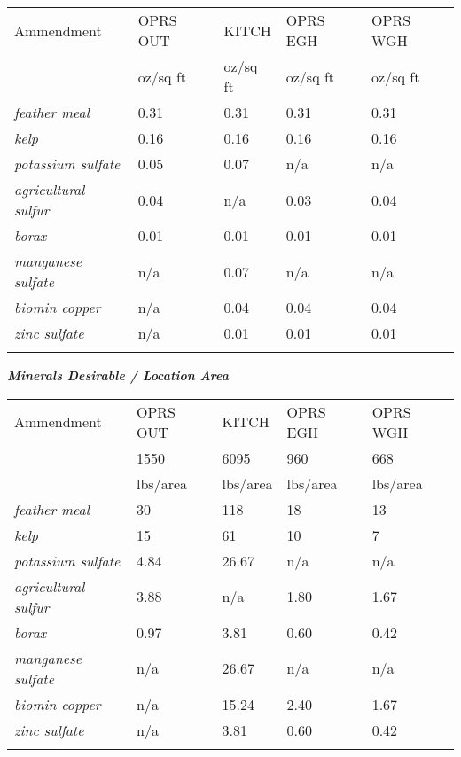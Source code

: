 \begin{longtable}[c]{@{}lllll@{}}
\toprule\addlinespace
Ammendment & OPRS OUT & KITCH & OPRS EGH & OPRS WGH
\\\addlinespace
\midrule\endhead
& oz/sq ft & oz/sq ft & oz/sq ft & oz/sq ft
\\\addlinespace
\emph{feather meal} & 0.31 & 0.31 & 0.31 & 0.31
\\\addlinespace
\emph{kelp} & 0.16 & 0.16 & 0.16 & 0.16
\\\addlinespace
\emph{potassium sulfate} & 0.05 & 0.07 & n/a & n/a
\\\addlinespace
\emph{agricultural sulfur} & 0.04 & n/a & 0.03 & 0.04
\\\addlinespace
\emph{borax} & 0.01 & 0.01 & 0.01 & 0.01
\\\addlinespace
\emph{manganese sulfate} & n/a & 0.07 & n/a & n/a
\\\addlinespace
\emph{biomin copper} & n/a & 0.04 & 0.04 & 0.04
\\\addlinespace
\emph{zinc sulfate} & n/a & 0.01 & 0.01 & 0.01
\\\addlinespace
\bottomrule
\end{longtable}

\textbf{\emph{Minerals Desirable / Location Area}}

\begin{longtable}[c]{@{}lllll@{}}
\toprule\addlinespace
Ammendment & OPRS OUT & KITCH & OPRS EGH & OPRS WGH
\\\addlinespace
\midrule\endhead
& 1550 & 6095 & 960 & 668
\\\addlinespace
& lbs/area & lbs/area & lbs/area & lbs/area
\\\addlinespace
\emph{feather meal} & 30 & 118 & 18 & 13
\\\addlinespace
\emph{kelp} & 15 & 61 & 10 & 7
\\\addlinespace
\emph{potassium sulfate} & 4.84 & 26.67 & n/a & n/a
\\\addlinespace
\emph{agricultural sulfur} & 3.88 & n/a & 1.80 & 1.67
\\\addlinespace
\emph{borax} & 0.97 & 3.81 & 0.60 & 0.42
\\\addlinespace
\emph{manganese sulfate} & n/a & 26.67 & n/a & n/a
\\\addlinespace
\emph{biomin copper} & n/a & 15.24 & 2.40 & 1.67
\\\addlinespace
\emph{zinc sulfate} & n/a & 3.81 & 0.60 & 0.42
\\\addlinespace
\bottomrule
\end{longtable}

